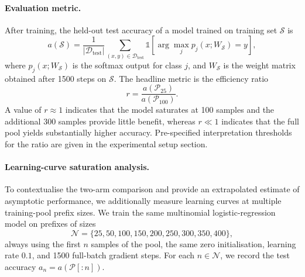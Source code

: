 \documentclass{article}
\begin{document}
\paragraph{Evaluation metric.}
After training, the held-out test accuracy of a model trained on training set \(\mathcal{S}\) is
\begin{equation}
a(\mathcal{S}) = \frac{1}{|\mathcal{D}_{\text{test}}|}
\sum_{(x,y) \in \mathcal{D}_{\text{test}}}
\mathbb{1}\left[\arg\max_j p_j(x; W_{\mathcal{S}}) = y\right],
\end{equation}
where \(p_j(x; W_{\mathcal{S}})\) is the softmax output for class \(j\), and \(W_{\mathcal{S}}\) is the weight matrix obtained after 1500 steps on \(\mathcal{S}\). The headline metric is the efficiency ratio
\begin{equation}
r = \frac{a(\mathcal{P}_{25})}{a(\mathcal{P}_{100})}.
\end{equation}
A value of \(r \approx 1\) indicates that the model saturates at 100 samples and the additional 300 samples provide little benefit, whereas \(r \ll 1\) indicates that the full pool yields substantially higher accuracy. Pre-specified interpretation thresholds for the ratio are given in the experimental setup section.

\paragraph{Learning-curve saturation analysis.}
To contextualise the two-arm comparison and provide an extrapolated estimate of asymptotic performance, we additionally measure learning curves at multiple training-pool prefix sizes. We train the same multinomial logistic-regression model on prefixes of sizes
\begin{equation}
\mathcal{N} = \{25, 50, 100, 150, 200, 250, 300, 350, 400\},
\end{equation}
always using the first \(n\) samples of the pool, the same zero initialisation, learning rate \(0.1\), and 1500 full-batch gradient steps. For each \(n \in \mathcal{N}\), we record the test accuracy \(a_n = a(\mathcal{P}[:n])\).
\end{document}
